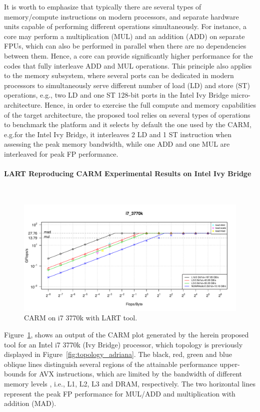 \documentclass[twoside,twocolumn,8pt]{extarticle}
\begin{document}
It is worth to emphasize that typically there are several types of memory/compute instructions on modern processors, and separate
hardware units capable of performing different operations simultaneously. For instance, a core
may perform a multiplication (MUL) and an addition (ADD) on separate FPUs, which  can also be performed in parallel when there are
no  dependencies between them. Hence, a core can provide significantly higher  performance for the codes that fully interleave ADD
and MUL operations. This principle also applies to the memory subsystem, where several ports can be dedicated in modern processors
to simultaneously serve different number of load (LD) and store (ST) operations, e.g., two LD and one ST 128-bit ports in the Intel
Ivy Bridge micro-architecture. Hence, in order to exercise the full  compute and memory capabilities of the target architecture,
the proposed tool relies on several types of operations to benchmark the platform and it selects by default the one used by
the CARM, e.g.for the Intel Ivy Bridge, it interleaves 2 LD and 1 ST instruction  when assessing the peak memory bandwidth, while
one ADD and one MUL are interleaved for peak FP performance. 

\paragraph*{LART Reproducing CARM Experimental Results on Intel Ivy Bridge}\mbox{}\\
\begin{figure}
  \includegraphics[width=\textwidth]{pictures/roofline_model}
  \caption{CARM on i7 3770k with LART tool.}
  \label{fig:LART_adriana}
\end{figure}

Figure~\ref{fig:LART_adriana}, shows an output of the CARM plot generated by the herein proposed tool for an Intel i7
3770k (Ivy Bridge) processor, which topology is previously displayed in Figure~\ref{fig:topology_adriana}.
The black, red, green and blue oblique lines distinguish several regions of the attainable performance upper-bounds for AVX
instructions, which are limited by the bandwidth of different memory levels , i.e., L1, L2, L3 and DRAM, respectively.
The two horizontal lines represent the peak FP performance for MUL/ADD and multiplication with addition (MAD). 
\end{document}
